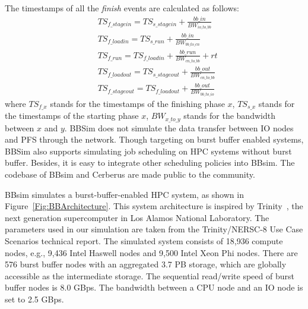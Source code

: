 The timestamps of all the \textit{finish} events are calculated as follows:
\begin{align}
        & TS_{f\_stagein} = TS_{s\_stagein} + \frac{bb\_in}{BW_{io\_to\_bb}}\label{Equ:FinIn} \\
        & TS_{f\_loadin} = TS_{s\_run} + \frac{bb\_in}{BW_{bb\_to\_cn}}\label{Equ:FinMemIn} \\
        & TS_{f\_run} = TS_{f\_loadin} + \frac{bb\_run}{BW_{cn\_to\_bb}} + rt\label{Equ:FinRun} \\
        & TS_{f\_loadout} = TS_{s\_stageout} + \frac{bb\_out}{BW_{cn\_to\_bb}}\label{Equ:FinMemOut} \\
        & TS_{f\_stageout} = TS_{f\_loadout} + \frac{bb\_out}{BW_{bb\_to\_io}} \label{Equ:FinOut}
\end{align}
where $TS_{f\_x}$ stands for the timestamps of the finishing phase $x$,
$TS_{s\_x}$ stands for the timestamps of the starting phase $x$,
$BW_{x\_to\_y}$ stands for the bandwidth between $x$ and $y$.
BBSim does not simulate the data transfer between IO nodes and PFS through the network.
Though targeting on burst buffer enabled systems,
BBSim also supports simulating job scheduling on HPC systems without burst buffer.
Besides, it is easy to integrate other scheduling policies into BBsim.
The codebase of BBsim and Cerberus are made public to the community\cite{bbsim-github}.





BBsim simulates a burst-buffer-enabled HPC system, as shown in Figure~\ref{Fig:BBArchitecture}.
This system architecture is inspired by Trinity~\cite{TrinitySystem}, 
the next generation supercomputer in Los Alamos National Laboratory.
The parameters used in our simulation are taken from the 
Trinity/NERSC-8 Use Case Scenarios technical report\cite{BBUseCase}.
The simulated system consists of 18,936 compute nodes,
e.g., 9,436 Intel Haswell nodes and 9,500 Intel Xeon Phi nodes.
There are 576 burst buffer nodes with an aggregated 3.7 PB storage, which are globally accessible as the intermediate storage.
The sequential read/write speed of burst buffer nodes is 8.0 GBps.
The bandwidth between a CPU node and an IO node is set to 2.5 GBps.

